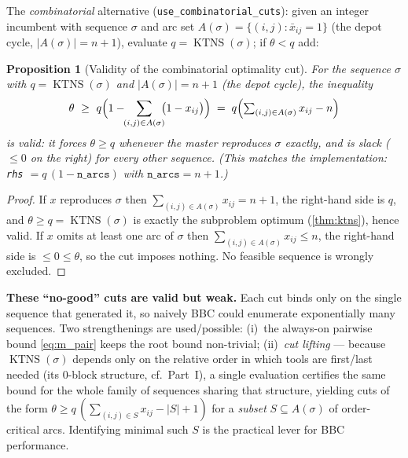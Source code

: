 \documentclass[11pt,a4paper]{article}
\theoremstyle{plain}
\newtheorem{proposition}[theorem]{Proposition}
\theoremstyle{definition}
\DeclareMathOperator{\KTNS}{KTNS}
\begin{document}
\medskip
The \emph{combinatorial} alternative (\texttt{use\_combinatorial\_cuts}): given an
integer incumbent with sequence $\sigma$ and arc set
$A(\sigma)=\{(i,j):\bar x_{ij}=1\}$ (the depot cycle, $|A(\sigma)|=n+1$), evaluate
$q=\KTNS(\sigma)$; if $\theta<q$ add:

\begin{thmbox}
\begin{proposition}[Validity of the combinatorial optimality cut]
\label{prop:cut}
For the sequence $\sigma$ with $q=\KTNS(\sigma)$ and $|A(\sigma)|=n+1$ (the depot cycle),
the inequality
\[
  \theta \ \ge\ q\Bigl(1-\!\!\sum_{(i,j)\in A(\sigma)}\!\!\bigl(1-x_{ij}\bigr)\Bigr)
  \;=\; q\Bigl(\textstyle\sum_{(i,j)\in A(\sigma)} x_{ij}-n\Bigr)
\]
is valid: it forces $\theta\ge q$ whenever the master reproduces $\sigma$ exactly, and is
slack ($\le 0$ on the right) for every other sequence. (This matches the implementation:
\texttt{rhs} $=q\,(1-\texttt{n\_arcs})$ with $\texttt{n\_arcs}=n+1$.)
\end{proposition}
\end{thmbox}
\begin{proofbox}
\begin{proof}
If $x$ reproduces $\sigma$ then $\sum_{(i,j)\in A(\sigma)}x_{ij}=n+1$, the right-hand side
is $q$, and $\theta\ge q=\KTNS(\sigma)$ is exactly the subproblem optimum (\cref{thm:ktns}),
hence valid. If $x$ omits at least one arc of $\sigma$ then
$\sum_{(i,j)\in A(\sigma)}x_{ij}\le n$, the right-hand side is $\le 0\le\theta$, so the cut
imposes nothing. No feasible sequence is wrongly excluded.
\end{proof}
\end{proofbox}

\begin{warnbox}
\textbf{These ``no-good'' cuts are valid but weak.} Each cut binds only on the single
sequence that generated it, so naively BBC could enumerate exponentially many sequences. Two
strengthenings are used/possible: (i)~the always-on pairwise bound \eqref{eq:m_pair} keeps
the root bound non-trivial; (ii)~\emph{cut lifting} --- because $\KTNS(\sigma)$ depends only
on the relative order in which tools are first/last needed (its $0$-block structure, cf.\
Part~I), a single evaluation certifies the same bound for the whole family of sequences
sharing that structure, yielding cuts of the form $\theta\ge q\,(\sum_{(i,j)\in S}x_{ij}-|S|+1)$
for a \emph{subset} $S\subseteq A(\sigma)$ of order-critical arcs. Identifying minimal such
$S$ is the practical lever for BBC performance.
\end{warnbox}
\end{document}
